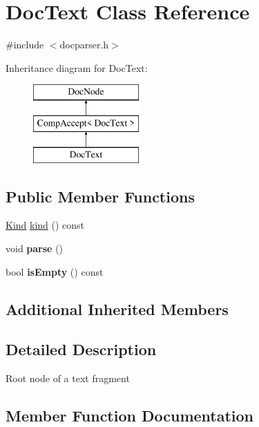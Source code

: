\hypertarget{class_doc_text}{}\section{Doc\+Text Class Reference}
\label{class_doc_text}


{\ttfamily \#include $<$docparser.\+h$>$}

Inheritance diagram for Doc\+Text\+:\begin{figure}[H]
\begin{center}
\leavevmode
\includegraphics[height=3.000000cm]{class_doc_text}
\end{center}
\end{figure}
\subsection*{Public Member Functions}
\begin{DoxyCompactItemize}
\item 
\mbox{\hyperlink{class_doc_node_aebd16e89ca590d84cbd40543ea5faadb}{Kind}} \mbox{\hyperlink{class_doc_text_a6a776c4d504d5a3c7f8078d86f181639}{kind}} () const
\item 
\mbox{\label{class_doc_text_aada5a740aa0832964895e683340b76a5}} 
void {\bfseries parse} ()
\item 
\mbox{\label{class_doc_text_adeed56e5d1701811126f1bd221412ef2}} 
bool {\bfseries is\+Empty} () const
\end{DoxyCompactItemize}
\subsection*{Additional Inherited Members}


\subsection{Detailed Description}
Root node of a text fragment 

\subsection{Member Function Documentation}
\mbox{\label{class_doc_text_a6a776c4d504d5a3c7f8078d86f181639}} 
